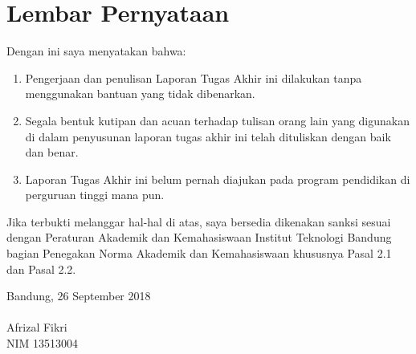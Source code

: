 \chapter*{Lembar Pernyataan}

Dengan ini saya menyatakan bahwa:

\begin{enumerate}

    \item Pengerjaan dan penulisan Laporan Tugas Akhir ini dilakukan tanpa menggunakan bantuan yang tidak dibenarkan.
    \item Segala bentuk kutipan dan acuan terhadap tulisan orang lain yang digunakan di dalam penyusunan laporan tugas akhir ini telah dituliskan dengan baik dan benar.
    \item Laporan Tugas Akhir ini belum pernah diajukan pada program pendidikan di perguruan tinggi mana pun.

\end{enumerate}

Jika terbukti melanggar hal-hal di atas, saya bersedia dikenakan sanksi sesuai dengan Peraturan Akademik dan Kemahasiswaan Institut Teknologi Bandung bagian Penegakan Norma Akademik dan Kemahasiswaan khususnya Pasal 2.1 dan Pasal 2.2.
\vspace{15mm}

Bandung, 26 September 2018 \\
\vspace{20mm} \\
Afrizal Fikri \\
NIM 13513004 \\
\clearpage